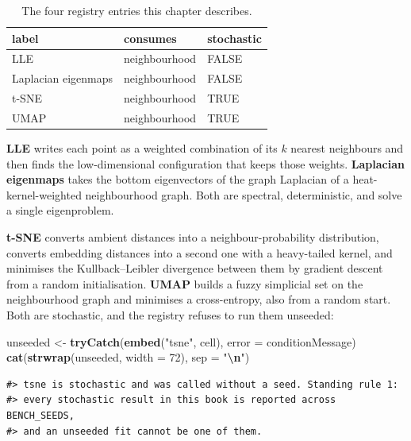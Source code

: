 \documentclass[
  british,
  a4paper,
]{book}
\newenvironment{Shaded}{\begin{snugshade}}{\end{snugshade}}
\newcommand{\AttributeTok}[1]{\textcolor[rgb]{0.13,0.29,0.53}{#1}}
\newcommand{\DecValTok}[1]{\textcolor[rgb]{0.00,0.00,0.81}{#1}}
\newcommand{\FunctionTok}[1]{\textcolor[rgb]{0.13,0.29,0.53}{\textbf{#1}}}
\newcommand{\NormalTok}[1]{#1}
\newcommand{\OtherTok}[1]{\textcolor[rgb]{0.56,0.35,0.01}{#1}}
\newcommand{\SpecialCharTok}[1]{\textcolor[rgb]{0.81,0.36,0.00}{\textbf{#1}}}
\newcommand{\StringTok}[1]{\textcolor[rgb]{0.31,0.60,0.02}{#1}}
\begin{document}
\begin{table}

\caption{\label{tab:nbr-registry}The four registry entries this chapter describes.}
\centering
\begin{tabular}[t]{l|l|l}
\hline
label & consumes & stochastic\\
\hline
LLE & neighbourhood & FALSE\\
\hline
Laplacian eigenmaps & neighbourhood & FALSE\\
\hline
t-SNE & neighbourhood & TRUE\\
\hline
UMAP & neighbourhood & TRUE\\
\hline
\end{tabular}
\end{table}

\textbf{LLE} \citep{roweis2000lle} writes each point as a weighted combination of its \(k\)
nearest neighbours and then finds the low-dimensional configuration that keeps
those weights. \textbf{Laplacian eigenmaps} \citep{belkin2003laplacian} takes the bottom
eigenvectors of the graph Laplacian of a heat-kernel-weighted neighbourhood
graph. Both are spectral, deterministic, and solve a single eigenproblem.

\textbf{t-SNE} \citep{vandermaaten2008tsne} converts ambient distances into a
neighbour-probability distribution, converts embedding distances into a second
one with a heavy-tailed kernel, and minimises the Kullback--Leibler divergence
between them by gradient descent from a random initialisation. \textbf{UMAP}
\citep{mcinnes2018umap} builds a fuzzy simplicial set on the neighbourhood graph and
minimises a cross-entropy, also from a random start. Both are stochastic, and
the registry refuses to run them unseeded:

\begin{Shaded}
\begin{Highlighting}[]
\NormalTok{unseeded }\OtherTok{\textless{}{-}} \FunctionTok{tryCatch}\NormalTok{(}\FunctionTok{embed}\NormalTok{(}\StringTok{"tsne"}\NormalTok{, cell), }\AttributeTok{error =}\NormalTok{ conditionMessage)}
\FunctionTok{cat}\NormalTok{(}\FunctionTok{strwrap}\NormalTok{(unseeded, }\AttributeTok{width =} \DecValTok{72}\NormalTok{), }\AttributeTok{sep =} \StringTok{"}\SpecialCharTok{\textbackslash{}n}\StringTok{"}\NormalTok{)}
\end{Highlighting}
\end{Shaded}

\begin{verbatim}
#> tsne is stochastic and was called without a seed. Standing rule 1:
#> every stochastic result in this book is reported across BENCH_SEEDS,
#> and an unseeded fit cannot be one of them.
\end{verbatim}
\end{document}
